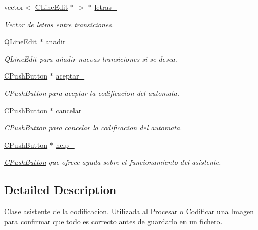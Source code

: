 \begin{DoxyCompactItemize}
vector$<$ \hyperlink{classCLineEdit}{C\+Line\+Edit} $\ast$ $>$ $\ast$ \hyperlink{classCAsistenteCodificacion_ac96318b5bc263836fb7d27269965e7c5}{letras\+\_\+}
\begin{DoxyCompactList}\small\item\em Vector de letras entre transiciones. \end{DoxyCompactList}\item 
Q\+Line\+Edit $\ast$ \hyperlink{classCAsistenteCodificacion_a42afd383b49f23e25fa26e1327dac06b}{anadir\+\_\+}
\begin{DoxyCompactList}\small\item\em Q\+Line\+Edit para añadir nuevas transiciones si se desea. \end{DoxyCompactList}\item 
\hyperlink{classCPushButton}{C\+Push\+Button} $\ast$ \hyperlink{classCAsistenteCodificacion_aef0570ce6c236522a0448a2f2eba39dd}{aceptar\+\_\+}
\begin{DoxyCompactList}\small\item\em \hyperlink{classCPushButton}{C\+Push\+Button} para aceptar la codificacion del automata. \end{DoxyCompactList}\item 
\hyperlink{classCPushButton}{C\+Push\+Button} $\ast$ \hyperlink{classCAsistenteCodificacion_a38cc5ae5adde6fa070e0ce0974de7778}{cancelar\+\_\+}
\begin{DoxyCompactList}\small\item\em \hyperlink{classCPushButton}{C\+Push\+Button} para cancelar la codificacion del automata. \end{DoxyCompactList}\item 
\hyperlink{classCPushButton}{C\+Push\+Button} $\ast$ \hyperlink{classCAsistenteCodificacion_a8d7ffb128dc1d576413d2a9a74f3884f}{help\+\_\+}
\begin{DoxyCompactList}\small\item\em \hyperlink{classCPushButton}{C\+Push\+Button} que ofrece ayuda sobre el funcionamiento del asistente. \end{DoxyCompactList}\end{DoxyCompactItemize}


\subsection{Detailed Description}
Clase asistente de la codificacion. Utilizada al Procesar o Codificar una Imagen para confirmar que todo es correcto antes de guardarlo en un fichero. 


